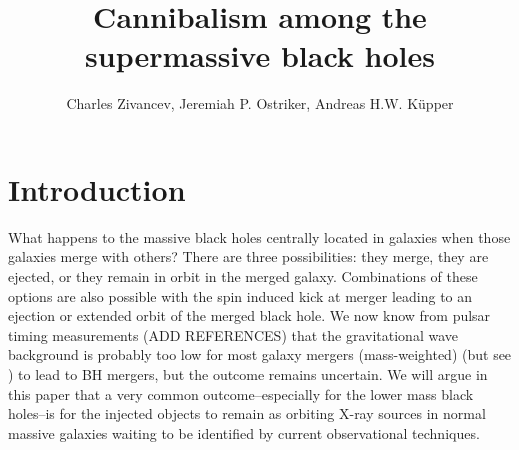 \documentclass[english, apj]{emulateapj}
\begin{document}
\title{Cannibalism among the supermassive black holes}


\author{Charles Zivancev, Jeremiah P. Ostriker, Andreas H.W. K\"upper}




\begin{abstract}

\end{abstract}






\section{Introduction}\label{sec:introduction}
What happens to the massive black holes centrally located in galaxies when those galaxies merge with others?  There are three possibilities: they merge, they are ejected, or they remain in orbit in the merged galaxy.  Combinations of these options are also possible with the spin induced kick at merger leading to an ejection or extended orbit of the merged black hole.  We now know from pulsar timing measurements (ADD REFERENCES) that the gravitational wave background is probably too low for most galaxy mergers (mass-weighted) (but see \cite{2018NatCo...9..573M}) to lead to BH mergers, but the outcome remains uncertain.  We will argue in this paper that a very common outcome--especially for the lower mass black holes--is for the injected objects to remain as orbiting X-ray sources in normal massive galaxies waiting to be identified by current observational techniques.
\end{document}
